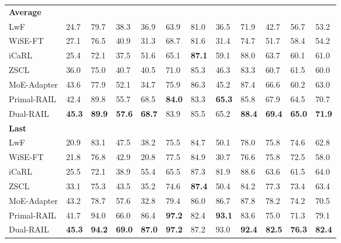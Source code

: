 \documentclass{article}
\begin{document}
\begin{table}
\begin{tabular}{b{9em}b{1.6em}b{1.6em}b{1.6em}b{1.6em}b{1.6em}b{1.6em}b{1.6em}b{1.6em}b{1.6em}b{1.6em}>{\centering\arraybackslash}m{3em}}
    \midrule
        \multicolumn{11}{l}{\textbf{Average}}\\
          \quad LwF& 24.7 & 79.7 & 38.3 & 36.9 & 63.9 & 81.0 & 36.5 & 71.9 & 42.7 & 56.7& {\cellcolor{lightgrey}}53.2\\
          \quad WiSE-FT& 27.1 & 76.5 & 40.9 & 31.3 & 68.7 & 81.6 & 31.4 & 74.7 & 51.7 & 58.4 & {\cellcolor{lightgrey}}54.2\\
          \quad iCaRL& 25.4 & 72.1 & 37.5 & 51.6 & 65.1 & \textbf{87.1} & 59.1 & 88.0 & 63.7 & 60.1 &{\cellcolor{lightgrey}} 61.0\\
          \quad ZSCL& 36.0 & 75.0 & 40.7 & 40.5 & 71.0 & 85.3 & 46.3 & 83.3 & 60.7 & 61.5 & {\cellcolor{lightgrey}}60.0\\
          \quad MoE-Adapter & 43.6 & 77.9 & 52.1 & 34.7 & 75.9 & 86.3 & 45.2 & 87.4 & 66.6 & 60.2 & {\cellcolor{lightgrey}}63.0\\
          \quad Primal-RAIL & 42.4 & 89.8 & 55.7 & 68.5 & \textbf{84.0} & 83.3 & \textbf{65.3} & 85.8 & 67.9 & 64.5 & {\cellcolor{lightgrey}}70.7\\
          \quad Dual-RAIL & \textbf{45.3} & \textbf{89.9} & \textbf{57.6} & \textbf{68.7} & 83.9 & 85.5 & 65.2 & \textbf{88.4} & \textbf{69.4} & \textbf{65.0} & {\cellcolor{lightgrey}}\textbf{71.9}\\
    \midrule
        \multicolumn{11}{l}{\textbf{Last}}\\
          \quad LwF& 20.9 & 83.1 & 47.5 & 38.2 & 75.5 & 84.7 & 50.1 & 78.0 & 75.8 & 74.6& {\cellcolor{lightgrey}}62.8\\
          \quad WiSE-FT& 21.8 & 76.8 & 42.9 & 20.8 & 77.5 & 84.9 & 30.7 & 76.6 & 75.8 & 72.5 & {\cellcolor{lightgrey}}58.0\\
          \quad iCaRL& 25.5 & 72.1 & 38.9 & 55.4 & 65.5 & 87.3 & 81.9 & 88.6 & 63.6 & 61.5 & {\cellcolor{lightgrey}}64.0\\
          \quad ZSCL& 33.1 & 75.3 & 43.5 & 35.2 & 74.6 & \textbf{87.4} & 50.4 & 84.2 & 77.3 & 73.4 & {\cellcolor{lightgrey}}63.4\\
          \quad MoE-Adapter & 43.2 & 78.7 & 57.6 & 32.8 & 79.4 & 86.0 & 86.7 & 87.8 & 78.2 & 74.2 & {\cellcolor{lightgrey}}70.5\\
          \quad Primal-RAIL & 41.7 & 94.0 & 66.0 & 86.4 & \textbf{97.2} & 82.4 & \textbf{93.1} & 83.6 & 75.0 & 71.3 & {\cellcolor{lightgrey}}79.1\\
          \quad Dual-RAIL & \textbf{45.3} & \textbf{94.2} & \textbf{69.0} & \textbf{87.0} & \textbf{97.2} & 87.2 & 93.0 & \textbf{92.4} & \textbf{82.5} & \textbf{76.3} & {\cellcolor{lightgrey}}\textbf{82.4}\\
    \bottomrule
    \end{tabular}
\end{table}
\end{document}

